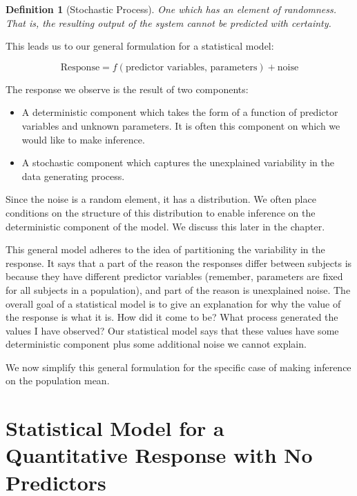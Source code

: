 \documentclass[
]{book}
\providecommand{\tightlist}{%
  \setlength{\itemsep}{0pt}\setlength{\parskip}{0pt}}
\theoremstyle{plain}
\theoremstyle{mydefn}
\newtheorem{definition}{Definition}[chapter]
\theoremstyle{myexmpl}
\theoremstyle{remark}
\begin{document}
\begin{definition}[Stochastic Process]
\protect\hypertarget{def:defn-stochastic-process}{}{\label{def:defn-stochastic-process} {} }One which has an element of randomness. That is, the resulting output of the system cannot be predicted with certainty.
\end{definition}

This leads us to our general formulation for a statistical model:

\begin{equation}
  \text{Response} = f(\text{predictor variables, parameters}) + \text{noise}
  \label{eq:general-model}
\end{equation}

The response we observe is the result of two components:

\begin{itemize}
\tightlist
\item
  A deterministic component which takes the form of a function of predictor variables and unknown parameters. It is often this component on which we would like to make inference.
\item
  A stochastic component which captures the unexplained variability in the data generating process.
\end{itemize}

Since the noise is a random element, it has a distribution. We often place conditions on the structure of this distribution to enable inference on the deterministic component of the model. We discuss this later in the chapter.

This general model adheres to the idea of partitioning the variability in the response. It says that a part of the reason the responses differ between subjects is because they have different predictor variables (remember, parameters are fixed for all subjects in a population), and part of the reason is unexplained noise. The overall goal of a statistical model is to give an explanation for why the value of the response is what it is. How did it come to be? What process generated the values I have observed? Our statistical model says that these values have some deterministic component plus some additional noise we cannot explain.

We now simplify this general formulation for the specific case of making inference on the population mean.

\hypertarget{statistical-model-for-a-quantitative-response-with-no-predictors}{%
\section{Statistical Model for a Quantitative Response with No Predictors}\label{statistical-model-for-a-quantitative-response-with-no-predictors}}
\end{document}

